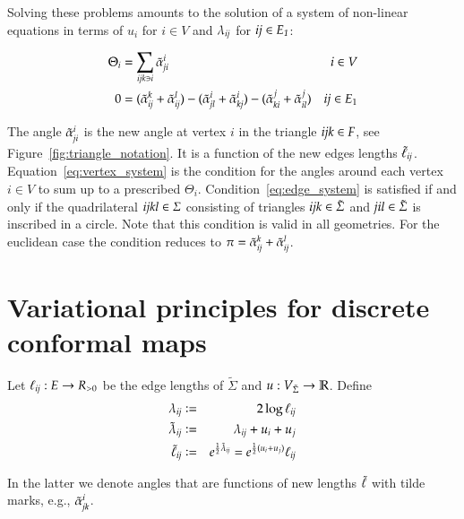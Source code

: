 \documentclass[Thesis]{subfiles}
\begin{document}
Solving these problems amounts to the solution of a system of non-linear equations in terms of $u_i$ for $i\in V$ and $\lambda_{\it ij}$ for $\it ij \in E_1$:

\begin{align}
	\Theta_i &=\sum_{\it ijk \ni i}\tilde{\alpha}_{\it ji}^i & i\in V\label{eq:vertex_system}\\
	0 &= (\tilde{\alpha}_{\it ij}^k + \tilde{\alpha}_{\it ij}^l) - (\tilde{\alpha}^i_{\it jl} + \tilde{\alpha}^i_{\it kj}) - (\tilde{\alpha}^j_{\it ki} + \tilde{\alpha}^j_{\it il}) & \textit{ij} \in E_1\label{eq:edge_system}
\end{align}

The angle $\tilde{\alpha}_{\it ji}^i$ is the new angle at vertex $i$ in the triangle $\it ijk\in F$, see Figure~\ref{fig:triangle_notation}.
It is a function of the new edges lengths $\tilde\ell_{\it ij}$.
Equation~\ref{eq:vertex_system} is the condition for the angles around each vertex $i \in V$ to sum up to a prescribed $\Theta_i$.
Condition~\ref{eq:edge_system} is satisfied if and only if the quadrilateral $\it ijkl\in \Sigma$ consisting of triangles $\it ijk\in \tilde \Sigma$ and $\it jil\in \tilde \Sigma$ is inscribed in a circle. Note that this condition is valid in all geometries. For the euclidean case the condition reduces to $\pi=\tilde{\alpha}_{\it ij}^k + \tilde{\alpha}_{\it ij}^l$.

\section{Variational principles for discrete conformal maps}
\label{sec:vari-princ}

\begin{definition}
Let $\ell_{\it ij}:E\to R_{>0}$ be the edge lengths of $\tilde \Sigma$ and $u:V_{\tilde\Sigma}\rightarrow\mathbb R$. Define
\begin{eqnarray*}
\lambda_{\it ij} &\vcentcolon=& 2\log \ell_{\it ij}\label{eq:lambda_def}\\
\tilde\lambda_{\it ij} &\vcentcolon=& \lambda_{\it ij}+u_i+u_j\\
\tilde \ell_{\it ij} &\vcentcolon=& e^{\frac{1}{2}\tilde \lambda_{\it ij}}=e^{\frac{1}{2}(u_i + u_j)}\ell_{\it ij}
\end{eqnarray*}
\end{definition}
In the latter we denote angles that are functions of new lengths $\tilde{\ell}$ with tilde marks, e.g., $\tilde{\alpha}_{\it jk}^i$.
\end{document}

